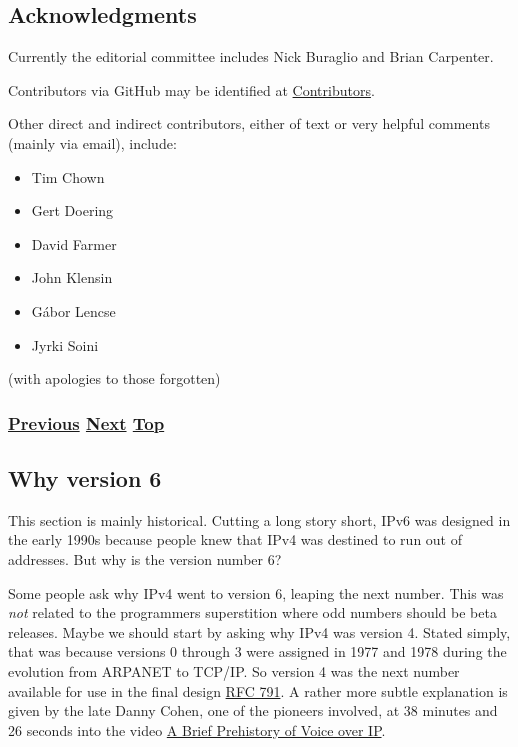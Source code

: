 \documentclass[
]{article}
\begin{document}
\pagebreak

\subsection{Acknowledgments}\label{acknowledgments}

Currently the editorial committee includes Nick Buraglio and Brian
Carpenter.

Contributors via GitHub may be identified at
\href{https://github.com/becarpenter/book6/graphs/contributors}{Contributors}.

Other direct and indirect contributors, either of text or very helpful
comments (mainly via email), include:

\begin{itemize}
\item
  Tim Chown
\item
  Gert Doering
\item
  David Farmer
\item
  John Klensin
\item
  Gábor Lencse
\item
  Jyrki Soini
\end{itemize}

(with apologies to those forgotten)

\subsubsection{\texorpdfstring{\hyperref[how-to-contribute]{Previous}
\hyperref[why-version-6]{Next}
\hyperref[introduction-and-foreword]{Top}}{Previous Next Top}}\label{previous-next-top-6}

\pagebreak

\subsection{Why version 6}\label{why-version-6}

This section is mainly historical. Cutting a long story short, IPv6 was
designed in the early 1990s because people knew that IPv4 was destined
to run out of addresses. But why is the version number 6?

Some people ask why IPv4 went to version 6, leaping the next number.
This was \emph{not} related to the programmer\textquotesingle s
superstition where odd numbers should be beta releases. Maybe we should
start by asking why IPv4 was version 4. Stated simply, that was because
versions 0 through 3 were assigned in 1977 and 1978 during the evolution
from ARPANET to TCP/IP. So version 4 was the next number available for
use in the final design
\href{https://www.rfc-editor.org/info/rfc791}{RFC 791}. A rather more
subtle explanation is given by the late Danny Cohen, one of the pioneers
involved, at 38 minutes and 26 seconds into the video
\href{https://youtu.be/av4KF1j-wp4}{A Brief Prehistory of Voice over
IP}.
\end{document}
